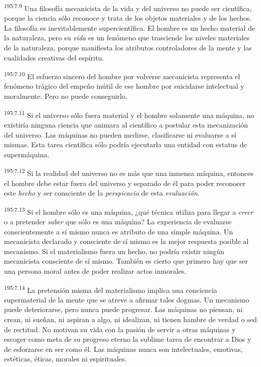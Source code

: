 \par 
\textsuperscript{195:7.9} Una filosofía mecanicista de la vida y del universo no puede ser científica, porque la ciencia sólo reconoce y trata de los objetos materiales y de los hechos. La filosofía es inevitablemente supercientífica. El hombre es un hecho material de la naturaleza, pero su \textit{vida} es un fenómeno que trasciende los niveles materiales de la naturaleza, porque manifiesta los atributos controladores de la mente y las cualidades creativas del espíritu.

\par 
\textsuperscript{195:7.10} El esfuerzo sincero del hombre por volverse mecanicista representa el fenómeno trágico del empeño inútil de ese hombre por suicidarse intelectual y moralmente. Pero no puede conseguirlo.

\par 
\textsuperscript{195:7.11} Si el universo sólo fuera material y el hombre solamente una máquina, no existiría ninguna ciencia que animara al científico a postular esta mecanización del universo. Las máquinas no pueden medirse, clasificarse ni evaluarse a sí mismas. Esta tarea científica sólo podría ejecutarla una entidad con estatus de supermáquina.

\par 
\textsuperscript{195:7.12} Si la realidad del universo no es más que una inmensa máquina, entonces el hombre debe estar fuera del universo y separado de él para poder reconocer este \textit{hecho} y ser consciente de la \textit{perspicacia} de esta \textit{evaluación}.

\par 
\textsuperscript{195:7.13} Si el hombre sólo es una máquina, ¿qué técnica utiliza para llegar a \textit{creer} o a pretender \textit{saber} que sólo es una máquina? La experiencia de evaluarse conscientemente a sí mismo nunca es atributo de una simple máquina. Un mecanicista declarado y consciente de sí mismo es la mejor respuesta posible al mecanismo. Si el materialismo fuera un hecho, no podría existir ningún mecanicista consciente de sí mismo. También es cierto que primero hay que ser una persona moral antes de poder realizar actos inmorales.

\par 
\textsuperscript{195:7.14} La pretensión misma del materialismo implica una conciencia supermaterial de la mente que se atreve a afirmar tales dogmas. Un mecanismo puede deteriorarse, pero nunca puede progresar. Las máquinas no piensan, ni crean, ni sueñan, ni aspiran a algo, ni idealizan, ni tienen hambre de verdad o sed de rectitud. No motivan su vida con la pasión de servir a otras máquinas y escoger como meta de su progreso eterno la sublime tarea de encontrar a Dios y de esforzarse en ser como él. Las máquinas nunca son intelectuales, emotivas, estéticas, éticas, morales ni espirituales.

